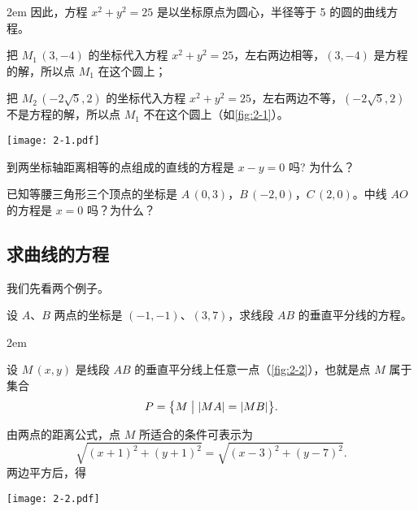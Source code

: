 \medskip\noindent
\begin{minipage}{0.7\linewidth}\parindent2em
  因此，方程 $x^2+y^2=25$ 是以坐标原点为圆心，半径等于 5 的圆的曲线方程。

  把 $M_1\,(3,-4)$ 的坐标代入方程 $x^2+y^2=25$，左右两边相等，$(3,-4)$ 是方程的解，所以点 $M_1$ 在这个圆上；

  把 $M_2\,(-2\sqrt{5},2)$ 的坐标代入方程 $x^2+y^2=25$，左右两边不等，$(-2\sqrt{5},2)$ 不是方程的解，所以点 $M_1$ 不在这个圆上（如\cref{fig:2-1}）。
\end{minipage}\hfill
\begin{minipage}{0.25\linewidth}\centering
\begin{figurehere}
  \texttt{[image: 2-1.pdf]}
  \caption{}\label{fig:2-1}
\end{figurehere}
\end{minipage}

\begin{Practice}
  \begin{question}
    \item 到两坐标轴距离相等的点组成的直线的方程是 $x-y=0$ 吗? 为什么？
    \item 已知等腰三角形三个顶点的坐标是 $A\,(0,3)$，$B\,(-2,0)$，$C\,(2,0)$。中线 $AO$ 的方程是 $x=0$ 吗？为什么？
  \end{question}
\end{Practice}

\subsection{求曲线的方程}
我们先看两个例子。
\begin{example}
  设 $A$、$B$ 两点的坐标是 $(-1,-1)$、$(3,7)$，求线段 $AB$ 的垂直平分线的方程。
\end{example}
\noindent
\begin{minipage}{0.65\linewidth}\parindent2em
\begin{solution}
  设 $M\,(x,y)$ 是线段 $AB$ 的垂直平分线上任意一点（\cref{fig:2-2}），也就是点 $M$ 属于集合
  \[ P = \bigl\{ M \bigm\vert |MA|= |MB| \bigr\}. \]

  由两点的距离公式，点 $M$ 所适合的条件可表示为
  \[ \sqrt{(x+1)^2+(y+1)^2}=\sqrt{(x-3)^2+(y-7)^2}.\]
  两边平方后，得
\end{solution}
\end{minipage}\hfill
\begin{minipage}{0.3\linewidth}\centering
\begin{figurehere}
  \texttt{[image: 2-2.pdf]}
  \caption{}\label{fig:2-2}
\end{figurehere}
\end{minipage}

